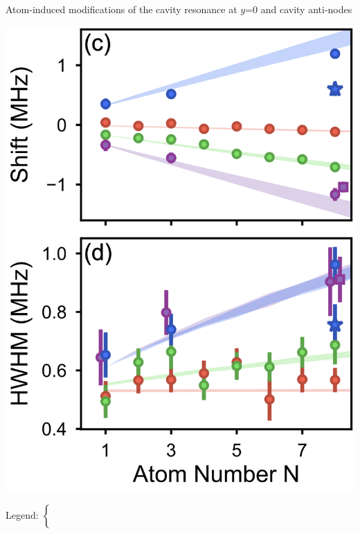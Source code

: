 \documentclass{beamer}
\begin{document}
\begin{frame}{Atom-induced modifications of the cavity resonance {\tiny at $y$=0 and cavity anti-nodes}}
	\begin{minipage}{0.4\textwidth}
		\includegraphics[width=\textwidth]{Figure_4c.png}
	\end{minipage}
	\hspace{0.3em}
	\begin{minipage}{0.2\textwidth}
		\footnotesize
		\vfill
		\begin{minipage}\textwidth
			Legend: $\begin{cases}
			~\\
			~\\
			~\\
			~\\
			~
			\end{cases}$
		\end{minipage}
		\vfill
	\end{minipage}
	\hspace{-2.5em}

\end{frame}
\end{document}
